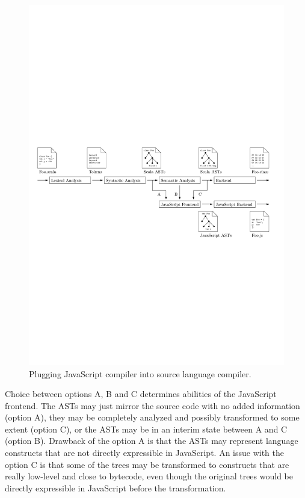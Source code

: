 \documentclass[12pt,a4paper]{report}
\begin{document}
\begin{figure}[ht]
  \centering
	\includegraphics[width=\linewidth,height=\textheight,keepaspectratio]{img/CompilerComplete.pdf}
	\caption{Plugging JavaScript compiler into source language compiler.}
	\label{CompilerComplete}
\end{figure}

Choice between options A, B and C determines abilities of the JavaScript frontend. The ASTs may just mirror the source code with no added information (option A), they may be completely analyzed and possibly transformed to some extent (option C), or the ASTs may be in an interim state between A and C (option B). Drawback of the option A is that the ASTs may represent language constructs that are not directly expressible in JavaScript. An issue with the option C is that some of the trees may be transformed to constructs that are really low-level and close to bytecode, even though the original trees would be directly expressible in JavaScript before the transformation.
\end{document}
